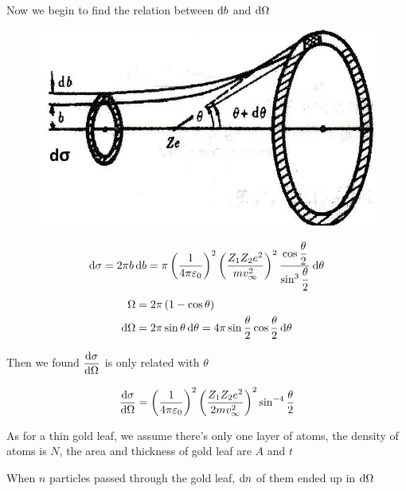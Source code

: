 Now we begin to find the relation between $\mathop{}\!\mathrm{d} b$ and $\mathop{}\!\mathrm{d} \Omega$

\begin{figure}[H]
  \centering
  \includegraphics[width=0.5\linewidth]{figures/Rutherford-1}
  \label{fig:}
\end{figure}

\begin{equation*}
  \begin{aligned}
    \mathop{}\!\mathrm{d} \sigma = 2 \pi b \mathop{}\!\mathrm{d} b = \pi \left( \dfrac{1}{4 \pi \varepsilon_0}  \right)^2 \left( \dfrac{Z_1 Z_2 e^2}{m v_{\infty}^2}  \right)^2 \dfrac{\cos \dfrac{\theta}{2} }{\sin^3 \dfrac{\theta}{2} } \mathop{}\!\mathrm{d} \theta 
  \end{aligned}
\end{equation*}
\begin{equation*}
  \begin{aligned}
    \Omega &= 2 \pi \left( 1 - \cos \theta \right) \\
    \mathop{}\!\mathrm{d} \Omega &= 2 \pi \sin \theta \mathop{}\!\mathrm{d} \theta = 4 \pi \sin \dfrac{\theta}{2} \cos \dfrac{\theta}{2} \mathop{}\!\mathrm{d} \theta  
  \end{aligned}
\end{equation*}

Then we found $\dfrac{\mathop{}\!\mathrm{d} \sigma}{\mathop{}\!\mathrm{d} \Omega}$ is only related with $\theta$

\begin{equation*}
  \begin{aligned}
    \dfrac{\mathop{}\!\mathrm{d} \sigma}{\mathop{}\!\mathrm{d} \Omega} = \left( \dfrac{1}{4 \pi \varepsilon_0}  \right)^2 \left( \dfrac{Z_1 Z_2 e^2}{2 m v_{\infty}^2}  \right)^2 \sin^{-4} \dfrac{\theta}{2}
  \end{aligned}
\end{equation*}

As for a thin gold leaf, we assume there's only one layer of atoms, the density of atoms is $N$, the area and thickness of gold leaf are $A$ and $t$

When $n$ particles passed through the gold leaf, $\mathop{}\!\mathrm{d} n$ of them ended up in $\mathop{}\!\mathrm{d} \Omega$

